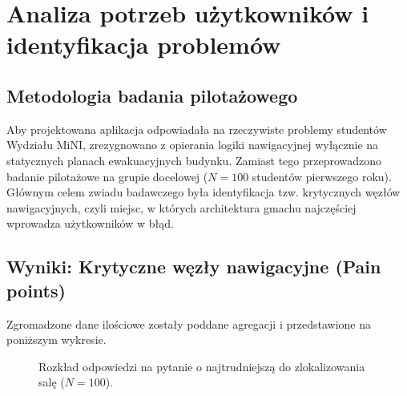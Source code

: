 \documentclass{article}
\begin{document}

\section{Analiza potrzeb użytkowników i identyfikacja problemów}

\subsection{Metodologia badania pilotażowego}
Aby projektowana aplikacja odpowiadała na rzeczywiste problemy studentów Wydziału MiNI, zrezygnowano z opierania logiki nawigacyjnej wyłącznie na statycznych planach ewakuacyjnych budynku. Zamiast tego przeprowadzono badanie pilotażowe na grupie docelowej ($N=100$ studentów pierwszego roku). Głównym celem zwiadu badawczego była identyfikacja tzw. krytycznych węzłów nawigacyjnych, czyli miejsc, w których architektura gmachu najczęściej wprowadza użytkowników w błąd. 

\subsection{Wyniki: Krytyczne węzły nawigacyjne (Pain points)}

Zgromadzone dane ilościowe zostały poddane agregacji i przedstawione na poniższym wykresie.

\begin{figure}[htpb]
    \centering
    \caption{Rozkład odpowiedzi na pytanie o najtrudniejszą do zlokalizowania salę ($N=100$).}
    \label{fig:trudne_sale}
\end{figure}
\end{document}

